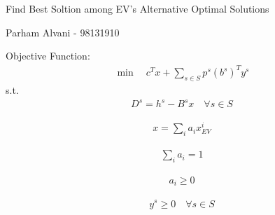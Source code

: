 \documentclass{article}
\begin{document}
\large %


{\Large Find Best Soltion among EV's Alternative Optimal Solutions  %
\hfill  }

\begin{center}
{\Large Parham Alvani - 98131910} %
\end{center}
\vspace{0.05in}


\par
Objective Function:
\begin{align*}
    \min \quad c^Tx + \sum_{s \in S} p^s (b^s)^T y^s
\end{align*}
s.t.
\begin{align*}
        D^s = h^s - B^sx \quad \forall s \in S
\end{align*}

\begin{align*}
        x = \sum_{i} a_i x^i_{EV}
\end{align*}

\begin{align*}
        \sum_{i} a_i = 1
\end{align*}

\begin{align*}
        a_i \ge 0
\end{align*}

\begin{align*}
        y^s \ge 0 \quad \forall s \in S
\end{align*}

\end{document}
